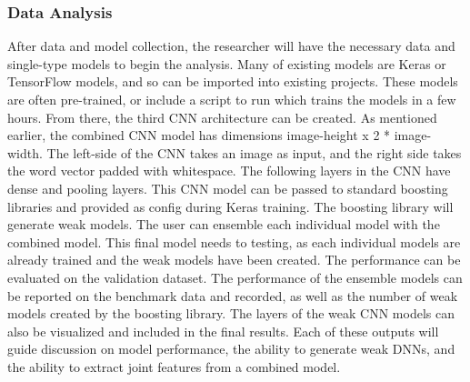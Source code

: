 \subsubsection{Data Analysis}

After data and model collection, the researcher will have the necessary data and single-type models to begin the analysis.  Many of existing models are Keras or TensorFlow models, and so can be imported into existing projects.  These models are often pre-trained, or include a script to run which trains the models in a few hours.  From there, the third CNN architecture can be created.  As mentioned earlier, the combined CNN model has dimensions image-height x 2 * image-width.  The left-side of the CNN takes an image as input, and the right side takes the word vector padded with whitespace.  The following layers in the CNN have dense and pooling layers.  This CNN model can be passed to standard boosting libraries and provided as config during Keras training.  The boosting library will generate weak models.  The user can ensemble each individual model with the combined model.  This final model needs to testing, as each individual models are already trained and the weak models have been created.  The performance can be evaluated on the validation dataset.  The performance of the ensemble models can be reported on the benchmark data and recorded, as well as the number of weak models created by the boosting library.  The layers of the weak CNN models can also be visualized and included in the final results.  Each of these outputs will guide discussion on model performance, the ability to generate weak DNNs, and the ability to extract joint features from a combined model.

